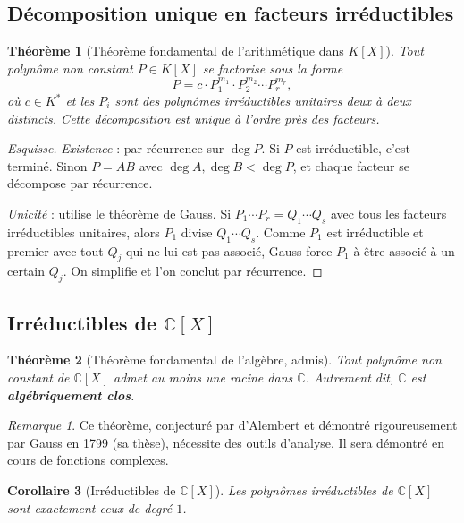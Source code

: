 \documentclass[12pt,a4paper]{report}
\newtheorem{theoreme}{Théorème}[section]
\newtheorem{corollaire}[theoreme]{Corollaire}
\theoremstyle{definition}
\theoremstyle{remark}
\newtheorem{remarque}{Remarque}[section]
\begin{document}
\subsection{Décomposition unique en facteurs irréductibles}

\begin{theoreme}[{Théorème fondamental de l'arithmétique dans $K[X]$}]
Tout polynôme non constant $P \in K[X]$ se factorise sous la forme
\[ P = c \cdot P_1^{m_1} \cdot P_2^{m_2} \cdots P_r^{m_r}, \]
où $c \in K^*$ et les $P_i$ sont des polynômes irréductibles \emph{unitaires} deux à deux distincts. Cette décomposition est \emph{unique} à l'ordre près des facteurs.
\end{theoreme}

\begin{proof}[Esquisse]
\emph{Existence} : par récurrence sur $\deg P$. Si $P$ est irréductible, c'est terminé. Sinon $P = AB$ avec $\deg A, \deg B < \deg P$, et chaque facteur se décompose par récurrence.

\emph{Unicité} : utilise le théorème de Gauss. Si $P_1 \cdots P_r = Q_1 \cdots Q_s$ avec tous les facteurs irréductibles unitaires, alors $P_1$ divise $Q_1 \cdots Q_s$. Comme $P_1$ est irréductible et premier avec tout $Q_j$ qui ne lui est pas associé, Gauss force $P_1$ à être associé à un certain $Q_j$. On simplifie et l'on conclut par récurrence.
\end{proof}

\subsection{Irréductibles de $\mathbb{C}[X]$}

\begin{theoreme}[Théorème fondamental de l'algèbre, admis]
Tout polynôme non constant de $\mathbb{C}[X]$ admet au moins une racine dans $\mathbb{C}$. Autrement dit, $\mathbb{C}$ est \textbf{algébriquement clos}.
\end{theoreme}

\begin{remarque}
Ce théorème, conjecturé par d'Alembert et démontré rigoureusement par Gauss en 1799 (sa thèse), nécessite des outils d'analyse. Il sera démontré en cours de fonctions complexes.
\end{remarque}

\begin{corollaire}[{Irréductibles de $\mathbb{C}[X]$}]
Les polynômes irréductibles de $\mathbb{C}[X]$ sont exactement ceux de degré $1$.
\end{corollaire}
\end{document}
